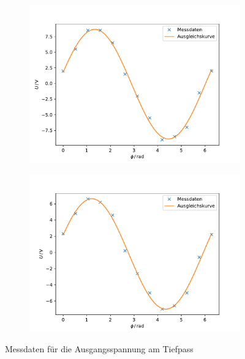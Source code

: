 \begin{figure}[h]
    \begin{subfigure}{0.45\textwidth}
        \centering
        \includegraphics[width=\textwidth]{assets/plot_1.pdf}
    \end{subfigure}
    \begin{subfigure}{0.45\textwidth}
        \centering
        \includegraphics[width=\textwidth]{assets/plot_2.pdf}
    \end{subfigure}
    \caption{Messdaten für die Ausgangsspannung am Tiefpass}
    \label{fig:tiefpass}
\end{figure}

